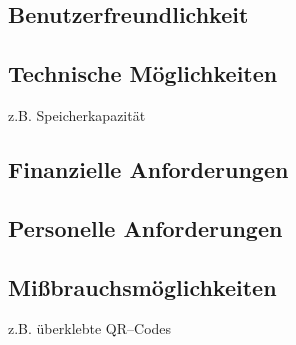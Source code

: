 \subsection{Benutzerfreundlichkeit}
\subsection{Technische Möglichkeiten}
z.B. Speicherkapazität

\subsection{Finanzielle Anforderungen}
\subsection{Personelle Anforderungen}
\subsection{Mißbrauchsmöglichkeiten}
z.B. überklebte QR--Codes